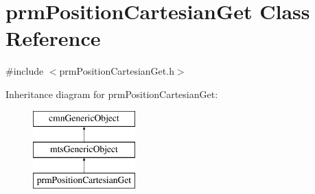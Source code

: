 \hypertarget{classprm_position_cartesian_get}{\section{prm\-Position\-Cartesian\-Get Class Reference}
\label{classprm_position_cartesian_get}
}


{\ttfamily \#include $<$prm\-Position\-Cartesian\-Get.\-h$>$}

Inheritance diagram for prm\-Position\-Cartesian\-Get\-:\begin{figure}[H]
\begin{center}
\leavevmode
\includegraphics[height=3.000000cm]{d8/d9d/classprm_position_cartesian_get}
\end{center}
\end{figure}

